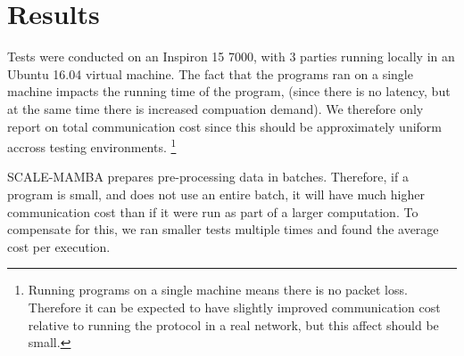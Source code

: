 \section{Results}

Tests were conducted on an Inspiron 15 7000, with 3 parties
running locally in an Ubuntu 16.04 virtual machine.
The fact that the programs ran on a single machine impacts
the running time of the program, (since there is no latency,
but at the same time there is increased compuation demand).
We therefore only report on total communication cost
since this should be approximately uniform accross testing
environments. 
\footnote{Running programs on a single machine means there
is no packet loss. Therefore it can be expected to have
slightly improved communication cost relative to running
the protocol in a real network, but this affect should be small.}

SCALE-MAMBA prepares pre-processing data in batches.
Therefore, if a program is small, and does not use 
an entire batch, it will have much higher communication cost
than if it were run as part of a larger computation.
To compensate for this, we ran smaller tests multiple times and 
found the average cost per execution.

